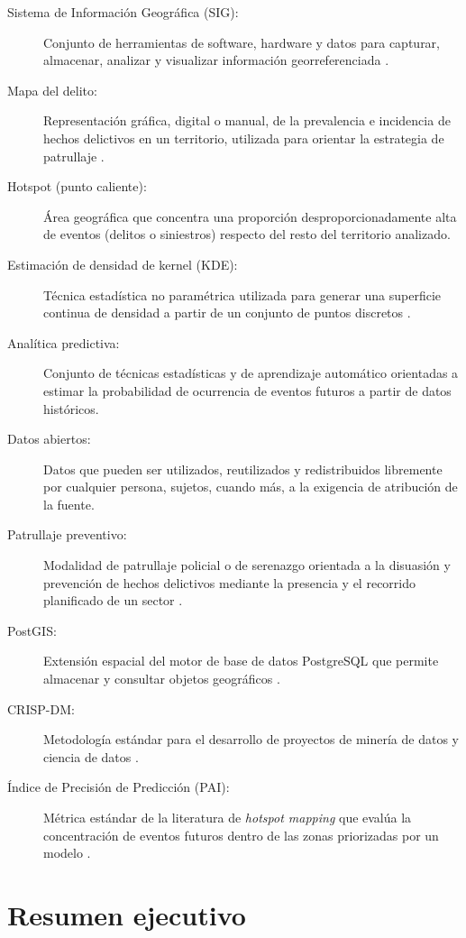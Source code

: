\documentclass[12pt,letterpaper]{report}
\begin{document}
\begin{description}
    \item[Sistema de Informaci\'on Geogr\'afica (SIG):] Conjunto de herramientas de software, hardware y datos para capturar, almacenar, analizar y visualizar informaci\'on georreferenciada \citep{eck2005mapping}.
    \item[Mapa del delito:] Representaci\'on gr\'afica, digital o manual, de la prevalencia e incidencia de hechos delictivos en un territorio, utilizada para orientar la estrategia de patrullaje \citep{pnp2018guia}.
    \item[Hotspot (punto caliente):] \'Area geogr\'afica que concentra una proporci\'on desproporcionadamente alta de eventos (delitos o siniestros) respecto del resto del territorio analizado.
    \item[Estimaci\'on de densidad de kernel (KDE):] T\'ecnica estad\'istica no param\'etrica utilizada para generar una superficie continua de densidad a partir de un conjunto de puntos discretos \citep{silverman1986kde}.
    \item[Analítica predictiva:] Conjunto de t\'ecnicas estad\'isticas y de aprendizaje autom\'atico orientadas a estimar la probabilidad de ocurrencia de eventos futuros a partir de datos hist\'oricos.
    \item[Datos abiertos:] Datos que pueden ser utilizados, reutilizados y redistribuidos libremente por cualquier persona, sujetos, cuando m\'as, a la exigencia de atribuci\'on de la fuente.
    \item[Patrullaje preventivo:] Modalidad de patrullaje policial o de serenazgo orientada a la disuasi\'on y prevenci\'on de hechos delictivos mediante la presencia y el recorrido planificado de un sector \citep{pnp2013manual}.
    \item[PostGIS:] Extensi\'on espacial del motor de base de datos PostgreSQL que permite almacenar y consultar objetos geogr\'aficos \citep{postgis2024}.
    \item[CRISP-DM:] Metodolog\'ia est\'andar para el desarrollo de proyectos de miner\'ia de datos y ciencia de datos \citep{crispdm2000}.
    \item[\'Indice de Precisi\'on de Predicci\'on (PAI):] M\'etrica est\'andar de la literatura de \textit{hotspot mapping} que eval\'ua la concentraci\'on de eventos futuros dentro de las zonas priorizadas por un modelo \citep{chainey2008kde}.
\end{description}

\section{Resumen ejecutivo}
\end{document}
